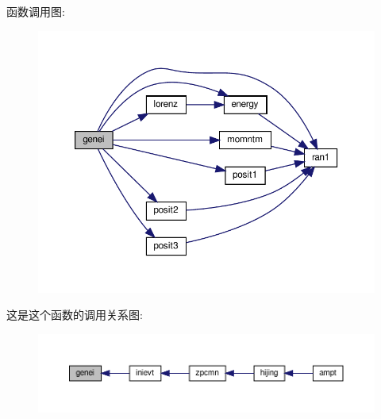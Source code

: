 函数调用图\+:
\nopagebreak
\begin{figure}[H]
\begin{center}
\leavevmode
\includegraphics[width=350pt]{genei_8f90_a241d04bd31d16965e0054d97f2809420_cgraph}
\end{center}
\end{figure}
这是这个函数的调用关系图\+:
\nopagebreak
\begin{figure}[H]
\begin{center}
\leavevmode
\includegraphics[width=350pt]{genei_8f90_a241d04bd31d16965e0054d97f2809420_icgraph}
\end{center}
\end{figure}
